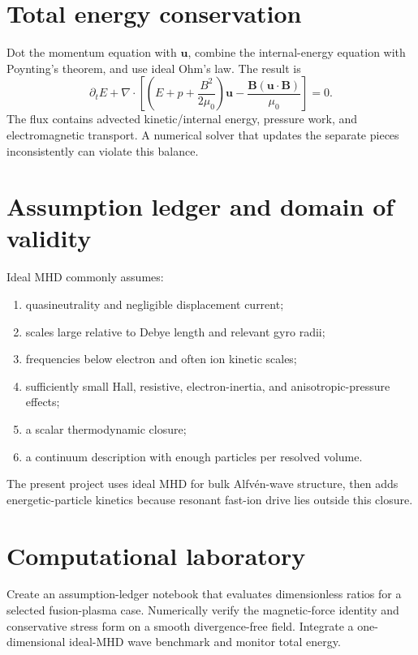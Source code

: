 \documentclass[11pt]{article}
\begin{document}
\section{Total energy conservation}

Dot the momentum equation with $\mathbf u$, combine the internal-energy equation with Poynting's theorem, and use ideal Ohm's law. The result is
\begin{equation}
\partial_tE+\nabla\cdot\left[
\left(E+p+\frac{B^2}{2\mu_0}\right)\mathbf u
-\frac{\mathbf B(\mathbf u\cdot\mathbf B)}{\mu_0}\right]=0.
\end{equation}
The flux contains advected kinetic/internal energy, pressure work, and electromagnetic transport. A numerical solver that updates the separate pieces inconsistently can violate this balance.


\section{Assumption ledger and domain of validity}

Ideal MHD commonly assumes:
\begin{enumerate}[leftmargin=1.8em]
\item quasineutrality and negligible displacement current;
\item scales large relative to Debye length and relevant gyro radii;
\item frequencies below electron and often ion kinetic scales;
\item sufficiently small Hall, resistive, electron-inertia, and anisotropic-pressure effects;
\item a scalar thermodynamic closure;
\item a continuum description with enough particles per resolved volume.
\end{enumerate}
The present project uses ideal MHD for bulk Alfvén-wave structure, then adds energetic-particle kinetics because resonant fast-ion drive lies outside this closure.


\section{Computational laboratory}
Create an assumption-ledger notebook that evaluates dimensionless ratios for a selected fusion-plasma case. Numerically verify the magnetic-force identity and conservative stress form on a smooth divergence-free field. Integrate a one-dimensional ideal-MHD wave benchmark and monitor total energy.
\end{document}
